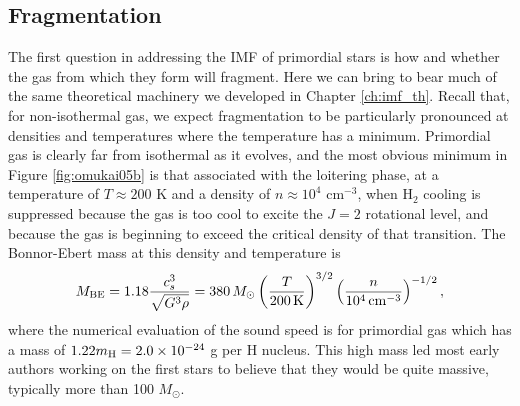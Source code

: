 \subsection{Fragmentation}

 The first question in addressing the IMF of primordial stars is how and whether the gas from which they form will fragment. Here we can bring to bear much of the same theoretical machinery we developed in Chapter \ref{ch:imf_th}. Recall that, for non-isothermal gas, we expect fragmentation to be particularly pronounced at densities and temperatures where the temperature has a minimum. Primordial gas is clearly far from isothermal as it evolves, and the most obvious minimum in Figure \ref{fig:omukai05b} is that associated with the loitering phase, at a temperature of $T\approx 200$ K and a density of $n\approx 10^4$ cm$^{-3}$, when H$_2$ cooling is suppressed because the gas is too cool to excite the $J=2$ rotational level, and because the gas is beginning to exceed the critical density of that transition. The Bonnor-Ebert mass at this density and temperature is
\begin{equation}
M_{\rm BE} = 1.18 \frac{c_s^3}{\sqrt{G^3\rho}} = 380\,M_\odot \left(\frac{T}{200\,\mathrm{K}}\right)^{3/2} \left(\frac{n}{10^4\,\mathrm{cm}^{-3}}\right)^{-1/2},
\end{equation}
where the numerical evaluation of the sound speed is for primordial gas which has a mass of $1.22m_{\rm H}=2.0\times 10^{-24}$ g per H nucleus. This high mass led most early authors working on the first stars to believe that they would be quite massive, typically more than 100 $M_\odot$.

